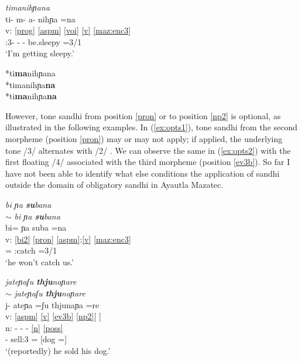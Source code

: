 \documentclass[output=paper]{langscibook}
\begin{document}
\ea \label{ex:obl}
\ea \label{ex:obl1} \textit{ti\2ma\4ni\2\st{}hɲa\2na\4\2}\\
\glll {} ti\2\ff- m- a\2- ni\2hɲa\3\ff{} =na\1\\
v: \ref{prog} \ref{aspm} \ref{voi} \ref{v} \ref{maz:enc3}\\
{} \Prog:3- \Hab- \Inch- be.sleepy =3/1\Sg\\
\glt `I'm getting sleepy.'

\ex \label{ex:obl2} *ti\2\textbf{ma\2}ni\2\st{}hɲa\2na\4\2 \\
\ex \label{ex:obl3} *ti\2ma\4ni\2\st{}hɲa\3\textbf{na\1}\\
\ex \label{ex:obl4} *ti\2\textbf{ma\2}ni\2\st{}hɲa\3\textbf{na\1}\\
\z
\z

However, tone sandhi from position \ref{pron} or to position \ref{np2} is optional, as illustrated in the following examples. In (\ref{ex:opts1}), tone sandhi from the second morpheme (position \ref{pron}) may or may not apply; if applied, the underlying tone /3/ alternates with /2/ \citep[cf.][142--143]{nakamoto20}. We can observe the same in (\ref{ex:opts2}) with the first floating /4/ associated with the third morpheme (position \ref{ev3b}). So far I have not been able to identify what else conditions the application of sandhi outside the domain of obligatory sandhi in Ayautla Mazatec.

\ea 
\ea \label{ex:opts1} \textit{bi\4 \st{}ɲa\3 \textbf{su\1}\st{}ba\1na\3}\\
$\sim$ \textit{bi\4 \st{}ɲa\2 \textbf{su\4}\st{}ba\1na\3}\\
\glll {} bi\4= ɲa\3\ff{} su\1ba\1 =na\3\ff\\
v: \ref{bi2} \ref{pron} \ref{aspm}:\ref{v} \ref{maz:enc3}\\
{} \Neg= \Incl{} \Pot:catch =3/1\Incl\\
\glt `he won't catch us.'

\ex \label{ex:opts2} \textit{ja\2te\2\st{}ɲa\2\3ʃu\3 \textbf{thju\1}na\2\st{}ɲa\2re\4\2}\\
$\sim$ \textit{ja\2te\2\st{}ɲa\2\3ʃu\2 \textbf{thju\4}na\2\st{}ɲa\2re\4\2}\\
\gllll {} j- a\2te\2ɲa\2\3 =ʃu\3\ff{} thju\1na\3ɲa\3\ff{} =re\1\\
v: \ref{aspm} \ref{v} \ref{ev3b} \ref{np2}[ ]\\
n: - - - \ref{n} \ref{poss}\\
{} \Pfv-  sell:3 =\Rep{} [dog =]\\
\glt `(reportedly) he sold his dog.' \citep[179]{nakamoto20}
\z
\z
\end{document}
